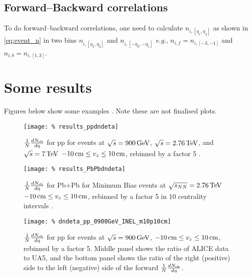 \documentclass[11pt]{article}
\def\AlwaysText#1{\ifmmode\relax\text{#1}\else #1\fi}
\newcommand{\AbbrName}[1]{\AlwaysText{{\scshape #1}}}
\newcommand{\INEL}{\AbbrName{inel}}
\newcommand{\mult}[1][]{\ensuremath N_{\text{ch}#1}}
\newcommand{\dndeta}[1][]{{\ensuremath%
    \ifx|#1|\else\left.\fi%
    \frac{1}{N}\frac{d\mult{}}{d\eta}%
    \ifx|#1|\else\right|_{#1}\fi%
}}
\newcommand{\GeV}[1]{\unit[#1]{\AlwaysText{GeV}}}
\newcommand{\TeV}[1]{\unit[#1]{\AlwaysText{TeV}}}
\newcommand{\cm}[1]{\unit[#1]{\AlwaysText{cm}}}
\begin{document}
\subsection{Forward--Backward correlations} 

To do forward--backward correlations, one need to calculate
$n_{i,[\eta_1,\eta_2]}$ as shown in \eqref{eq:event_n} in two bins
$n_{i,[\eta_1,\eta_2]}$ and $n_{i,[-\eta_2,-\eta_1]}$ \textit{e.g.},
$n_{i,f}=n_{i,[-3,-1]}$ and $n_{i,b}=n_{i,[1,3]}$. 

\clearpage
\section{Some results}

Figures below show some examples \cite{hhd:2009}.  Note these are not finalised
plots. 
\begin{figure}[hbp]
  \centering
  \texttt{[image: \%
    results\_ppdndeta]}
  \caption{$\dndeta$ for pp for \INEL{} events at
    $\sqrt{s}=\GeV{900}$, $\sqrt{s}=\TeV{2.76}$, and $\sqrt{s}=\TeV{7}$
    $\cm{-10}\le v_z\le\cm{10}$, rebinned by a factor 5 \cite{hhd:2009}. 
}
  \label{fig:1}
\end{figure} 
\begin{figure}[hbp]
  \centering
  \texttt{[image: \%
    results\_PbPbdndeta]}
  \caption{$\dndeta$ for Pb+Pb for Minimum Bias events at
    $\sqrt{s_{NN}}=\TeV{2.76}$ $\cm{-10}\le v_z\le\cm{10}$, rebinned by a
    factor 5 in 10 centrality intervals \cite{hhd:2009}. 
}
  \label{fig:2}
\end{figure} 


\iffalse
\begin{figure}[hbp]
  \centering
  \texttt{[image: \%
    dndeta\_pp\_0900GeV\_INEL\_m10p10cm]}
  \caption{$\dndeta$ for pp for \INEL{} events at $\sqrt{s}=\GeV{900}$,
    $\cm{-10}\le v_z\le\cm{10}$, rebinned by a factor 5.  Middle panel
    shows the ratio of ALICE data to UA5, and the bottom panel shows
    the ratio of the right (positive) side to the left (negative) side
    of the forward $\dndeta$.}
  \label{fig:1}
\end{figure} 
\end{document}
